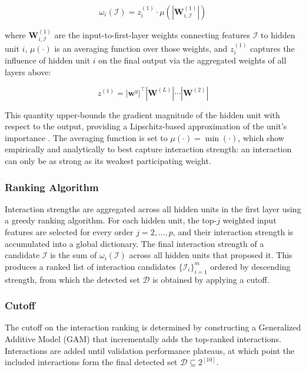 \documentclass{article}
\begin{document}
\begin{equation}
    \omega_i(\mathcal{I}) = z_i^{(1)} \cdot \mu\!\left(\left|\mathbf{W}_{i,\mathcal{I}}^{(1)}\right|\right)
\end{equation}

where $\mathbf{W}_{i,\mathcal{I}}^{(1)}$ are the input-to-first-layer weights 
connecting features $\mathcal{I}$ to hidden unit $i$, $\mu(\cdot)$ is an 
averaging function over those weights, and $z_i^{(1)}$ captures the influence 
of hidden unit $i$ on the final output via the aggregated weights of all 
layers above:

\begin{equation}
    z^{(1)} = |\mathbf{w}^y|^\top \left|\mathbf{W}^{(L)}\right| \cdots 
    \left|\mathbf{W}^{(2)}\right|
\end{equation}

This quantity upper-bounds the gradient magnitude of the hidden unit with 
respect to the output, providing a Lipschitz-based approximation of the 
unit's importance \citep{tsang2017detecting}. The averaging function is set 
to $\mu(\cdot) = \min(\cdot)$, which \cite{tsang2017detecting} show 
empirically and analytically to best capture interaction strength: an 
interaction can only be as strong as its weakest participating weight.

\subsubsection{Ranking Algorithm}
Interaction strengths are aggregated across all hidden units in the first 
layer using a greedy ranking algorithm. For each hidden unit, the top-$j$ 
weighted input features are selected for every order $j = 2, \dots, p$, and 
their interaction strength is accumulated into a global dictionary. The final 
interaction strength of a candidate $\mathcal{I}$ is the sum of 
$\omega_i(\mathcal{I})$ across all hidden units that proposed it. This 
produces a ranked list of interaction candidates 
$\{\mathcal{I}_i\}_{i=1}^{m}$ ordered by descending strength, from which the 
detected set $\mathcal{D}$ is obtained by applying a cutoff.

\subsubsection{Cutoff}
The cutoff on the interaction ranking is determined by constructing a 
Generalized Additive Model (GAM) that incrementally adds the top-ranked 
interactions. Interactions are added until validation performance plateaus, 
at which point the included interactions form the final detected set 
$\mathcal{D} \subseteq 2^{[10]}$.
\end{document}
